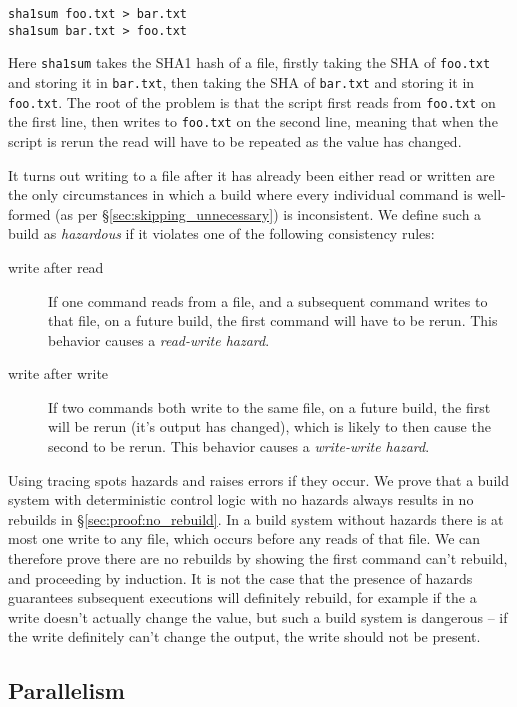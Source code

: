 \begin{verbatim}
sha1sum foo.txt > bar.txt
sha1sum bar.txt > foo.txt
\end{verbatim}

Here \texttt{sha1sum} takes the SHA1 hash of a file, firstly taking the SHA of \texttt{foo.txt} and storing it in \texttt{bar.txt}, then taking the SHA of \texttt{bar.txt} and storing it in \texttt{foo.txt}. The root of the problem is that the script first reads from \texttt{foo.txt} on the first line, then writes to \texttt{foo.txt} on the second line, meaning that when the script is rerun the read will have to be repeated as the value has changed.

It turns out writing to a file after it has already been either read or written are the only circumstances in which a build where every individual command is well-formed (as per \S\ref{sec:skipping_unnecessary}) is inconsistent. We define such a build as \emph{hazardous} if it violates one of the following consistency rules:

\begin{description}
\item[write after read] If one command reads from a file, and a subsequent command writes to that file, on a future build, the first command will have to be rerun.  This behavior causes a \emph{read-write hazard}.
\item[write after write] If two commands both write to the same file, on a future build, the first will be rerun (it's output has changed), which is likely to then cause the second to be rerun.  This behavior causes a \emph{write-write hazard}.
\end{description}

Using tracing \Rattle spots hazards and raises errors if they occur. We prove that a build system with deterministic control logic with no hazards always results in no rebuilds in \S\ref{sec:proof:no_rebuild}. In a build system without hazards there is at most one write to any file, which occurs before any reads of that file. We can therefore prove there are no rebuilds by showing the first command can't rebuild, and proceeding by induction. It is not the case that the presence of hazards guarantees subsequent executions will definitely rebuild, for example if the a write doesn't actually change the value, but such a build system is dangerous -- if the write definitely can't change the output, the write should not be present.

\subsection{Parallelism}


